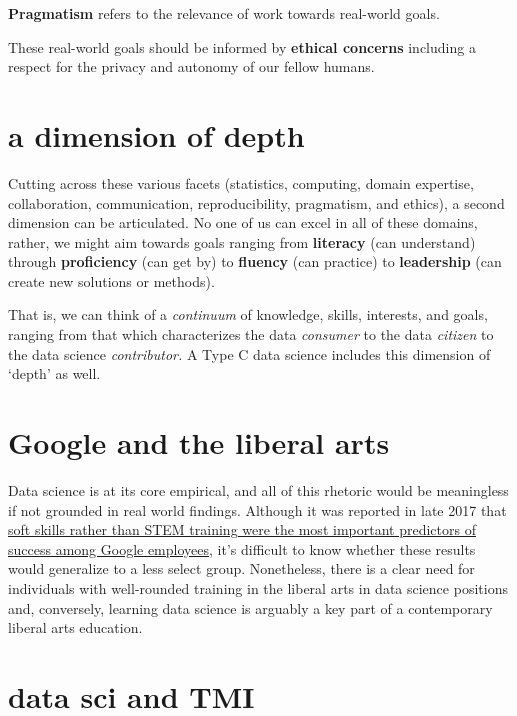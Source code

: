 \documentclass[
  openany]{book}
\begin{document}
\textbf{Pragmatism} refers to the relevance of work towards real-world goals.

These real-world goals should be informed by \textbf{ethical concerns} including a respect for the privacy and autonomy of our fellow humans.

\hypertarget{a-dimension-of-depth}{%
\section{a dimension of depth}\label{a-dimension-of-depth}}

Cutting across these various facets (statistics, computing, domain expertise, collaboration, communication, reproducibility, pragmatism, and ethics), a second dimension can be articulated. No one of us can excel in all of these domains, rather, we might aim towards goals ranging from \textbf{literacy} (can understand) through \textbf{proficiency} (can get by) to \textbf{fluency} (can practice) to \textbf{leadership} (can create new solutions or methods).

That is, we can think of a \emph{continuum} of knowledge, skills, interests, and goals, ranging from that which characterizes the data \emph{consumer} to the data \emph{citizen} to the data science \emph{contributor.} A Type C data science includes this dimension of `depth' as well.

\hypertarget{google-and-the-liberal-arts}{%
\section{Google and the liberal arts}\label{google-and-the-liberal-arts}}

Data science is at its core empirical, and all of this rhetoric would be meaningless if not grounded in real world findings. Although it was reported in late 2017 that \href{https://www.washingtonpost.com/news/answer-sheet/wp/2017/12/20/the-surprising-thing-google-learned-about-its-employees-and-what-it-means-for-todays-students/?sw_bypass=true\&utm_term=.23e48235d66e}{soft skills rather than STEM training were the most important predictors of success among Google employees}, it's difficult to know whether these results would generalize to a less select group. Nonetheless, there is a clear need for individuals with well-rounded training in the liberal arts in data science positions and, conversely, learning data science is arguably a key part of a contemporary liberal arts education.

\hypertarget{data-sci-and-tmi}{%
\section{data sci and TMI}\label{data-sci-and-tmi}}
\end{document}
